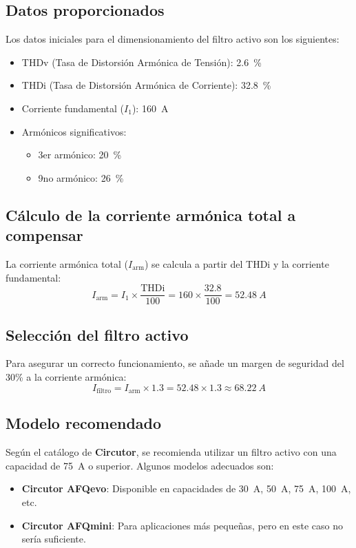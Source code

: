 \documentclass[a4paper,10pt]{article}
\begin{document}
\begin{Form}
\subsection{Datos proporcionados}
Los datos iniciales para el dimensionamiento del filtro activo son los siguientes:
\begin{itemize}
    \item THDv (Tasa de Distorsión Armónica de Tensión): \SI{2.6}{\%}
    \item THDi (Tasa de Distorsión Armónica de Corriente): \SI{32.8}{\%}
    \item Corriente fundamental (\(I_1\)): \SI{160}{A}
    \item Armónicos significativos:
        \begin{itemize}
            \item 3er armónico: \SI{20}{\%}
            \item 9no armónico: \SI{26}{\%}
        \end{itemize}
\end{itemize}

\subsection{Cálculo de la corriente armónica total a compensar}
La corriente armónica total (\(I_{\text{arm}}\)) se calcula a partir del THDi y la corriente fundamental:
\[
I_{\text{arm}} = I_1 \times \frac{\text{THDi}}{100} = 160 \times \frac{32.8}{100} = \SI{52.48}{A}
\]

\subsection{Selección del filtro activo}
Para asegurar un correcto funcionamiento, se añade un margen de seguridad del 30\% a la corriente armónica:
\[
I_{\text{filtro}} = I_{\text{arm}} \times 1.3 = 52.48 \times 1.3 \approx \SI{68.22}{A}
\]

\subsection{Modelo recomendado}
Según el catálogo de \textbf{Circutor}, se recomienda utilizar un filtro activo con una capacidad de \SI{75}{A} o superior. Algunos modelos adecuados son:
\begin{itemize}
    \item \textbf{Circutor AFQevo}: Disponible en capacidades de \SI{30}{A}, \SI{50}{A}, \SI{75}{A}, \SI{100}{A}, etc.
    \item \textbf{Circutor AFQmini}: Para aplicaciones más pequeñas, pero en este caso no sería suficiente.
\end{itemize}


\end{Form}
\end{document}
